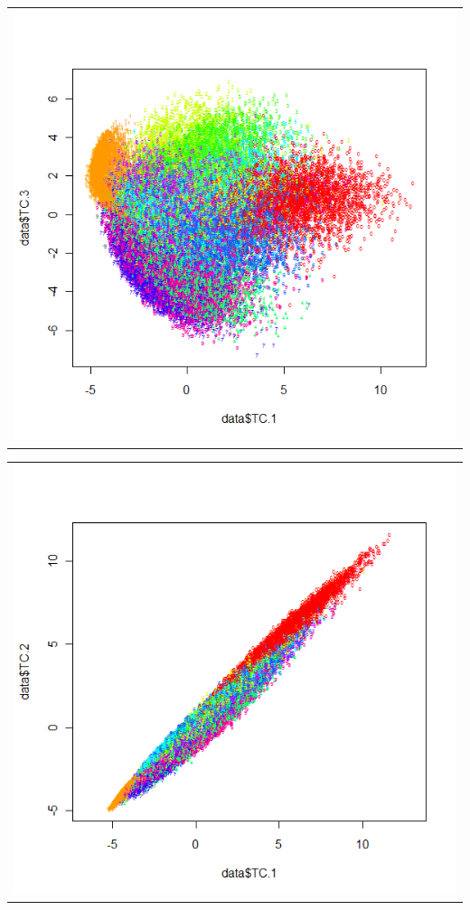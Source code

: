\begin{table}[h!]
\begin{subtable}{.5\linewidth}
\begin{tabular}{c}
	\includegraphics[scale=0.4]{exp5/AllVsAll/PCA-13}
\end{tabular}
\end{subtable}
\begin{subtable}{.5\linewidth}
\begin{tabular}{c}
	\includegraphics[scale=0.4]{exp5/AllVsAll/PCA-12}
\end{tabular}
\end{subtable}
\end{table}

